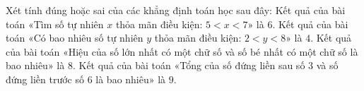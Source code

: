 \begin{ex} %
Xét tính đúng hoặc sai của các khẳng định toán học sau đây:
\choiceTF
{\True Kết quả của bài toán «Tìm số tự nhiên $x$ thỏa mãn điều kiện: $5 < x < 7$» là $6$.}
{Kết quả của bài toán «Có bao nhiêu số tự nhiên $y$ thỏa mãn điều kiện: $2 < y < 8$» là $4$.}
{Kết quả của bài toán «Hiệu của số lớn nhất có một chữ số và số bé nhất có một chữ số là bao nhiêu» là $8$.}
{\True Kết quả của bài toán «Tổng của số đứng liền sau số 3 và số đứng liền trước số 6 là bao nhiêu» là $9$.}
\end{ex}

